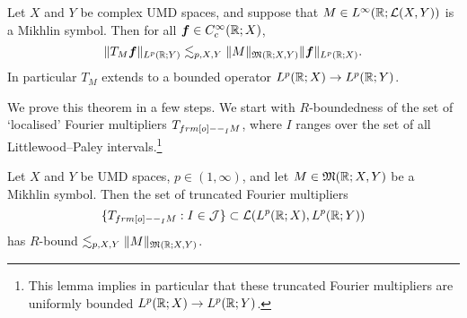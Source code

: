 \begin{thm}\label{thm:Mikhlin}
  Let $X$ and $Y$ be complex UMD spaces, and suppose that $M \in L^\infty(\mathbb{R};\mathcal{L}(X,Y))$ is a Mikhlin symbol.
  Then for all $\bm{f} \in C_{c}^\infty(\mathbb{R};X)$,
  \begin{equation*}
    \|T_{M} \bm{f}\|_{L^p(\mathbb{R};Y)} \lesssim_{p,X,Y} \|M\|_{\mathfrak{M}(\mathbb{R};X,Y)} \|\bm{f}\|_{L^p(\mathbb{R};X)}.
  \end{equation*}
  In particular $T_{M}$ extends to a bounded operator $L^p(\mathbb{R};X) \to L^p(\mathbb{R};Y)$.
\end{thm}

We prove this theorem in a few steps.
We start with $R$-boundedness of the set of `localised' Fourier multipliers $T_{\1_{I} M}$, where $I$ ranges over the set of all Littlewood--Paley intervals.\footnote{This lemma implies in particular that these truncated Fourier multipliers are uniformly bounded $L^p(\mathbb{R};X) \to L^p(\mathbb{R};Y)$.}

\begin{lem}\label{lem:Mikhlin-components-R}
  Let $X$ and $Y$ be UMD spaces, $p \in (1,\infty)$, and let $M \in \mathfrak{M}(\mathbb{R};X,Y)$ be a Mikhlin symbol.
  Then the set of truncated Fourier multipliers
  \begin{equation*}
    \{T_{\1_{I} M} : I \in \mc{J}\} \subset \Lin(L^p(\R;X), L^p(\R;Y))
  \end{equation*}
  has $R$-bound $\lesssim_{p,X,Y} \|M\|_{\mathfrak{M}(\mathbb{R};X,Y)}$.
\end{lem}

